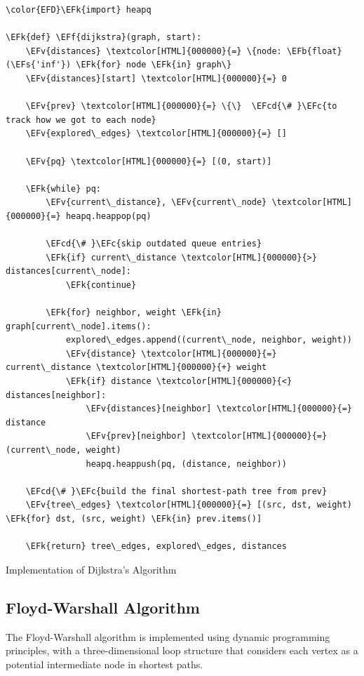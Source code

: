 \documentclass[a4paper,12pt]{article}
\newcommand{\EFc}[1]{\textcolor{EFc}{#1}} %
\newcommand{\EFcd}[1]{\textcolor{EFcd}{#1}} %
\newcommand{\EFs}[1]{\textcolor{EFs}{#1}} %
\newcommand{\EFk}[1]{\textcolor{EFk}{#1}} %
\newcommand{\EFb}[1]{\textcolor{EFb}{#1}} %
\newcommand{\EFf}[1]{\textcolor{EFf}{#1}} %
\newcommand{\EFv}[1]{\textcolor{EFv}{#1}} %
\begin{document}
\begin{listing}[htbp]
\begin{Code}
\begin{Verbatim}
\color{EFD}\EFk{import} heapq

\EFk{def} \EFf{dijkstra}(graph, start):
    \EFv{distances} \textcolor[HTML]{000000}{=} \{node: \EFb{float}(\EFs{'inf'}) \EFk{for} node \EFk{in} graph\}
    \EFv{distances}[start] \textcolor[HTML]{000000}{=} 0

    \EFv{prev} \textcolor[HTML]{000000}{=} \{\}  \EFcd{\# }\EFc{to track how we got to each node}
    \EFv{explored\_edges} \textcolor[HTML]{000000}{=} []

    \EFv{pq} \textcolor[HTML]{000000}{=} [(0, start)]

    \EFk{while} pq:
        \EFv{current\_distance}, \EFv{current\_node} \textcolor[HTML]{000000}{=} heapq.heappop(pq)

        \EFcd{\# }\EFc{skip outdated queue entries}
        \EFk{if} current\_distance \textcolor[HTML]{000000}{>} distances[current\_node]:
            \EFk{continue}

        \EFk{for} neighbor, weight \EFk{in} graph[current\_node].items():
            explored\_edges.append((current\_node, neighbor, weight))
            \EFv{distance} \textcolor[HTML]{000000}{=} current\_distance \textcolor[HTML]{000000}{+} weight
            \EFk{if} distance \textcolor[HTML]{000000}{<} distances[neighbor]:
                \EFv{distances}[neighbor] \textcolor[HTML]{000000}{=} distance
                \EFv{prev}[neighbor] \textcolor[HTML]{000000}{=} (current\_node, weight)
                heapq.heappush(pq, (distance, neighbor))

    \EFcd{\# }\EFc{build the final shortest-path tree from prev}
    \EFv{tree\_edges} \textcolor[HTML]{000000}{=} [(src, dst, weight) \EFk{for} dst, (src, weight) \EFk{in} prev.items()]

    \EFk{return} tree\_edges, explored\_edges, distances
\end{Verbatim}
\end{Code}
\caption{\label{lst:orge901865}Implementation of Dijkstra's Algorithm}
\end{listing}
\subsection{Floyd-Warshall Algorithm}
\label{sec:orgbaa010b}
The Floyd-Warshall algorithm is implemented using dynamic programming principles, with a three-dimensional loop structure that considers each vertex as a potential intermediate node in shortest paths.
\end{document}
